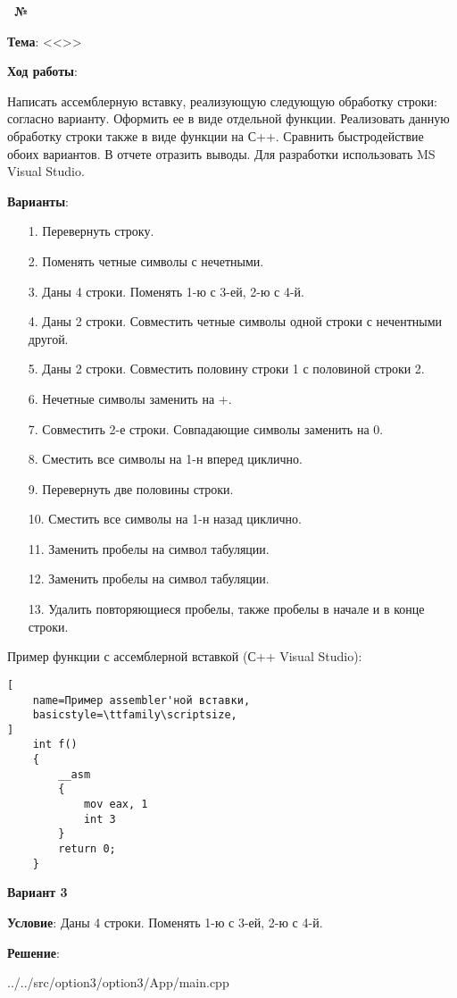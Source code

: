 \begin{center}
    \textbf{\titlePageWorkType~№\titlePageWorkNumber~\titlePageWorkPart}
\end{center}

\textbf{Тема}: <<\titlePageTopic>>


\begin{center}
    \textbf{Ход работы}:
\end{center}

Написать ассемблерную вставку, реализующую следующую обработку строки: согласно варианту.
Оформить ее в виде отдельной функции.
Реализовать данную обработку строки также в виде функции на С++.
Сравнить быстродействие обоих вариантов.
В отчете отразить выводы.
Для разработки использовать MS Visual Studio.

\textbf{Варианты}:
\begin{enumerate}
    \item[1.] Перевернуть строку.
    \item[2.] Поменять четные символы с нечетными.
    \item[3.] Даны 4 строки. Поменять 1-ю с 3-ей, 2-ю с 4-й.
    \item[4.] Даны 2 строки. Совместить четные символы одной строки с нечентными другой.
    \item[5.] Даны 2 строки. Совместить половину строки 1 с половиной строки 2.
    \item[6.] Нечетные символы заменить на +.
    \item[7.] Совместить 2-е строки. Совпадающие символы заменить на 0.
    \item[8.] Сместить все символы на 1-н вперед циклично.
    \item[9.] Перевернуть две половины строки.
    \item[10.] Сместить все символы на 1-н назад циклично.
    \item[11.] Заменить пробелы на символ табуляции.
    \item[12.] Заменить пробелы на символ табуляции.
    \item[13.] Удалить повторяющиеся пробелы, также пробелы в начале и в конце строки.
\end{enumerate}

Пример функции с ассемблерной вставкой (С++ Visual Studio): 

\begin{lstlisting}[
    name=Пример assembler'ной вставки,
    basicstyle=\ttfamily\scriptsize,
]
    int f()
    {
        __asm
        {
            mov eax, 1
            int 3
        }
        return 0;
    }
\end{lstlisting}

\newpage

\begin{center}
    \textbf{Вариант 3}
\end{center}

\textbf{Условие}:
Даны 4 строки. Поменять 1-ю с 3-ей, 2-ю с 4-й.

\textbf{Решение}:


{../../src/option3/option3/App/main.cpp}
